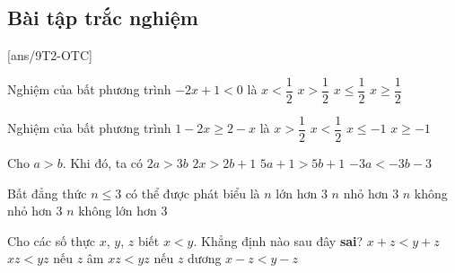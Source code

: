 \subsection{Bài tập trắc nghiệm}
[ans/9T2-OTC]
\begin{ex}
	Nghiệm của bất phương trình $-2x + 1 < 0$ là
	\choice
	{$x < \dfrac{1}{2}$}
	{\True $x > \dfrac{1}{2}$}
	{$x \leq \dfrac{1}{2}$}
	{$x \geq \dfrac{1}{2}$}
\end{ex}
\begin{ex}
	Nghiệm của bất phương trình $1 - 2x \geq 2 - x$ là
	\choice
	{$x > \dfrac{1}{2}$}
	{$x < \dfrac{1}{2}$}
	{\True $x \leq -1$}
	{$x \geq -1$}
\end{ex}
\begin{ex}
	Cho $a > b$. Khi đó, ta có
	\choice
	{$2a > 3b$}
	{$2x > 2b + 1$}
	{\True $5a + 1 > 5b + 1$}
	{$-3a < -3b - 3$}
\end{ex}
\begin{ex}
	Bất đẳng thức $n \leq 3$ có thể được phát biểu là
	\choice
	{$n$ lớn hơn $3$}
	{$n$ nhỏ hơn $3$}
	{$n$ không nhỏ hơn $3$}
	{\True $n$ không lớn hơn $3$}
\end{ex}
\begin{ex}
	Cho các số thực $x$, $y$, $z$ biết $x<y$. Khẳng định nào sau đây {\bf sai}?
	\choice
	{$x+z<y+z$}
	{\True $x z<y z$ nếu $z$ âm}
	{$x z<y z$ nếu $z$ dương}
	{$x-z<y-z$}
\end{ex}
